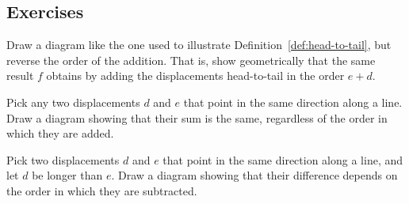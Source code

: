 \subsection{Exercises}

\begin{exercise}
   Draw a diagram like the one used to illustrate
   Definition~\ref{def:head-to-tail}, but reverse the order of the addition.
   That is, show geometrically that the same result $f$ obtains by adding the
   displacements head-to-tail in the order $e + d$.
\end{exercise}

\begin{exercise}
   Pick any two displacements $d$ and $e$ that point in the same direction
   along a line. Draw a diagram showing that their sum is the same, regardless
   of the order in which they are added.
\end{exercise}

\begin{exercise}
   Pick two displacements $d$ and $e$ that point in the same direction along a
   line, and let $d$ be longer than $e$. Draw a diagram showing that their
   difference depends on the order in which they are subtracted.
\end{exercise}

